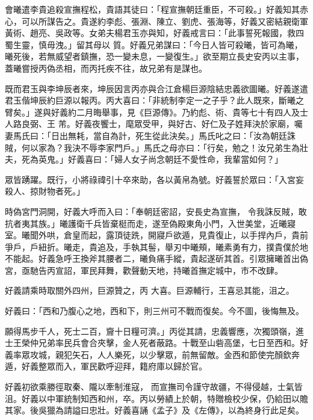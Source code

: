 \begin{pinyinscope}
 會曦遣李貴追殺宣撫程松，貴語其徒曰：「程宣撫朝廷重臣，不可殺。」好義知其赤心，可以所謀告之。貴遂約李彪、張淵、陳立、劉虎、張海等，好義又密結親衛軍黃術、趙亮、吳政等。女弟夫楊君玉亦與知，好義戒言曰：「此事誓死報國，救四蜀生靈，慎毋洩。」留其母以
 質。好義兄弟謀曰：「今日人皆可殺曦，皆可為曦，曦死後，若無威望者鎮撫，恐一變未息，一變復生。」欲至期立長史安丙以主事，蓋曦嘗授丙偽丞相，而丙托疾不往，故兄弟有是謀也。



 既而君玉與李坤辰者來，坤辰因言丙亦與合江倉楊巨源陰結忠義欲圖曦。好義遂遣君玉偕坤辰約巨源以報丙。丙大喜曰：「非統制李定一之子乎？此人既來，斷曦之臂矣。」遂與好義約二月晦舉事，見《巨源傳》。乃約彪、術、貴等七十有四人及士人路良弼、王
 芾。好義夜饗士，麾眾受甲，與好古、好仁及子姓拜決於家廟，囑妻馬氏曰：「日出無耗，當自為計，死生從此決矣。」馬氏叱之曰：「汝為朝廷誅賊，何以家為？我決不辱李家門戶。」馬氏之母亦曰：「行矣，勉之！汝兄弟生為壯夫，死為英鬼。」好義喜曰：「婦人女子尚念朝廷不愛性命，我輩當如何？」



 眾皆踴躍。既行，小將祿禕引十卒來助，各以黃帛為號。好義誓於眾曰：「入宮妄殺人、掠財物者死。」



 時偽宮門洞開，好義大呼而入曰：「奉朝廷密詔，安長史為宣撫，
 令我誅反賊，敢抗者夷其族。」曦護衛千兵皆棄梃而走，遂至偽殿東角小門，入世美堂，近曦寢室。曦聞外哄，倉皇而起，露頂徒跣，開寢戶欲遁，見貴復止，以手捍內戶，貴前爭戶，戶紐折。曦走，貴追及，手執其髻，舉刃中曦頰，曦素勇有力，撲貴僕於地不能起。好義急呼王換斧其腰者二，曦負痛手縱，貴起遂斫其首。引眾擁曦首出偽宮，亟馳告丙宣詔，軍民拜舞，歡聲動天地，持曦首撫定城中，市不改肆。



 好義請乘時取關外四州，巨源贊之，丙
 大喜。巨源輔行，王喜忌其能，沮之。



 好義曰：「西和乃腹心之地，西和下，則三州可不戰而復矣。今不圖，後悔無及。



 願得馬步千人，死士二百，齎十日糧可濟。」丙從其請，忠義響應，次獨頭嶺，進士王榮仲兄弟率民兵會合夾擊，金人死者蔽路。十戰至山砦高堡，七日至西和。好義率眾攻城，親犯矢石，人人樂死，以少擊眾，前無留敵。金西和節使完顏欽奔遁，好義整眾而入，軍民歡呼迎拜，籍府庫以歸於官。



 好義初欲乘勝徑取秦、隴以牽制淮寇，
 而宣撫司令謹守故疆，不得侵越，士氣皆沮。好義以中軍統制知西和州，卒。丙以勞績上於朝，特贈檢校少保，仍給田以贍其家。後吳獵為請謚曰忠壯。好義喜誦《孟子》及《左傳》，以為終身行此足矣。




\end{pinyinscope}
